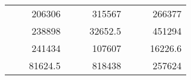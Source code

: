 \begin{table}[H]
\begin{tabular}{|ccrccrccc}
\rowcolor[HTML]{DAE8FC} 
\multicolumn{1}{|c|}{\cellcolor[HTML]{FFFFC7}}                                & \multicolumn{1}{c|}{\cellcolor[HTML]{DAE8FC}}                      & \multicolumn{1}{r|}{\cellcolor[HTML]{DAE8FC}206306}    & \multicolumn{1}{c|}{\cellcolor[HTML]{FFFFC7}}                                & \multicolumn{1}{c|}{\cellcolor[HTML]{DAE8FC}}                       & \multicolumn{1}{r|}{\cellcolor[HTML]{DAE8FC}315567}    & \multicolumn{1}{c|}{\cellcolor[HTML]{FFFFC7}}                                & \multicolumn{1}{c|}{\cellcolor[HTML]{DAE8FC}}                      & \multicolumn{1}{r|}{\cellcolor[HTML]{DAE8FC}266377}    \\ \cline{3-3} \cline{6-6} \cline{9-9} 
\multicolumn{1}{|c|}{\cellcolor[HTML]{FFFFC7}}                                & \multicolumn{1}{c|}{\cellcolor[HTML]{DAE8FC}}                      & \multicolumn{1}{r|}{\cellcolor[HTML]{DDFDFF}238898}    & \multicolumn{1}{c|}{\cellcolor[HTML]{FFFFC7}}                                & \multicolumn{1}{c|}{\cellcolor[HTML]{DAE8FC}}                       & \multicolumn{1}{r|}{\cellcolor[HTML]{DDFDFF}32652.5}   & \multicolumn{1}{c|}{\cellcolor[HTML]{FFFFC7}}                                & \multicolumn{1}{c|}{\cellcolor[HTML]{DAE8FC}}                      & \multicolumn{1}{r|}{\cellcolor[HTML]{DDFDFF}451294}    \\ \cline{3-3} \cline{6-6} \cline{9-9} 
\rowcolor[HTML]{DAE8FC} 
\multicolumn{1}{|c|}{\cellcolor[HTML]{FFFFC7}}                                & \multicolumn{1}{c|}{\cellcolor[HTML]{DAE8FC}}                      & \multicolumn{1}{r|}{\cellcolor[HTML]{DAE8FC}241434}    & \multicolumn{1}{c|}{\cellcolor[HTML]{FFFFC7}}                                & \multicolumn{1}{c|}{\cellcolor[HTML]{DAE8FC}}                       & \multicolumn{1}{r|}{\cellcolor[HTML]{DAE8FC}107607}    & \multicolumn{1}{c|}{\cellcolor[HTML]{FFFFC7}}                                & \multicolumn{1}{c|}{\cellcolor[HTML]{DAE8FC}}                      & \multicolumn{1}{r|}{\cellcolor[HTML]{DAE8FC}16226.6}   \\ \cline{3-3} \cline{6-6} \cline{9-9} 
\multicolumn{1}{|c|}{\cellcolor[HTML]{FFFFC7}}                                & \multicolumn{1}{c|}{\cellcolor[HTML]{DAE8FC}}                      & \multicolumn{1}{r|}{\cellcolor[HTML]{DDFDFF}81624.5}   & \multicolumn{1}{c|}{\cellcolor[HTML]{FFFFC7}}                                & \multicolumn{1}{c|}{\cellcolor[HTML]{DAE8FC}}                       & \multicolumn{1}{r|}{\cellcolor[HTML]{DDFDFF}818438}    & \multicolumn{1}{c|}{\cellcolor[HTML]{FFFFC7}}                                & \multicolumn{1}{c|}{\cellcolor[HTML]{DAE8FC}}                      & \multicolumn{1}{r|}{\cellcolor[HTML]{DDFDFF}257624}    \\ \cline{3-3} \cline{6-6} \cline{9-9} 

\end{tabular}
\end{table}
